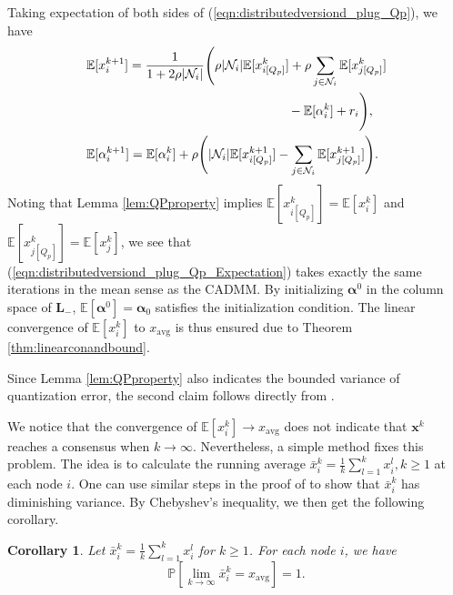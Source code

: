 \documentclass[journal]{IEEEtran}
\newtheorem{corollary}{Corollary}
\begin{document}
\begin{IEEEproof}
Taking expectation of both sides of  (\ref{eqn:distributedversiond_plug_Qp}), we have 
\begin{equation}
\label{eqn:distributedversiond_plug_Qp_Expectation}
\begin{aligned}
&\mathbb{E}[x_i^{k+1}]=\frac{1}{1+2\rho|\mathcal{N}_i|}\Bigg(\rho|\mathcal{N}_i| \mathbb{E}[x_{i[Q_p]}^k]+\rho\sum_{j\in\mathcal{N}_i} \mathbb{E}[x_{j[Q_p]}^k]\\&\hspace{2.2in}-\mathbb{E}[\alpha_i^k]+r_i\Bigg),\\
& \mathbb{E}[\alpha_i^{k+1}]= \mathbb{E}[\alpha_i^k]+\rho\Bigg(|\mathcal{N}_i| \mathbb{E}[x_{i[Q_p]}^{k+1}]-\sum_{j\in\mathcal{N}_i}  \mathbb{E}[x_{j[Q_p]}^{k+1}]\Bigg).
\end{aligned}
\end{equation} 
Noting that Lemma \ref{lem:QPproperty} implies $\mathbb{E}[x_{i[Q_p]}^k]=\mathbb{E}[x_i^k]$ and $\mathbb{E}[x_{j[Q_p]}^k]=\mathbb{E}[x_j^k]$, we see that (\ref{eqn:distributedversiond_plug_Qp_Expectation}) takes exactly the same iterations in the mean sense as the CADMM. By initializing $\bm\alpha^0$ in the column space of $\bm L_-$, $\mathbb{E}[\bm\alpha^0]=\bm\alpha_0$ satisfies the initialization condition. The linear convergence of $\mathbb{E}[x_i^k]$ to $x_\text{avg}$ is thus ensured due to Theorem \ref{thm:linearconandbound}.

Since Lemma \ref{lem:QPproperty} also indicates the bounded variance of quantization error, the second claim follows directly from \cite[Proposition 3]{Zhu2009}.
\end{IEEEproof}

We notice that the convergence of $\mathbb{E}[x_i^k]\to x_\text{avg}$ does not indicate that $\bm x^k$ reaches a consensus when $k\to\infty$. Nevertheless, a simple method fixes this problem. The idea is to calculate the running average $\bar{x}_i^k=\frac{1}{k}\sum_{l=1}^k x_i^l,k\geq1$ at each node $i$. One can use similar steps in the proof of \cite[Proposition 3]{Zhu2009} to show that $\bar{x}_i^k$ has diminishing variance. By Chebyshev's inequality, we then get the following corollary.
\begin{corollary}
Let $\bar{x}_i^k=\frac{1}{k}\sum_{l=1}^k x_i^l$ for $k\geq1$. For each node $i$, we have $$\mathbb{P}\left[\lim_{k\to\infty}\bar{x}_i^k=x_\text{avg}\right]=1.$$
\end{corollary}
 
\end{document}
